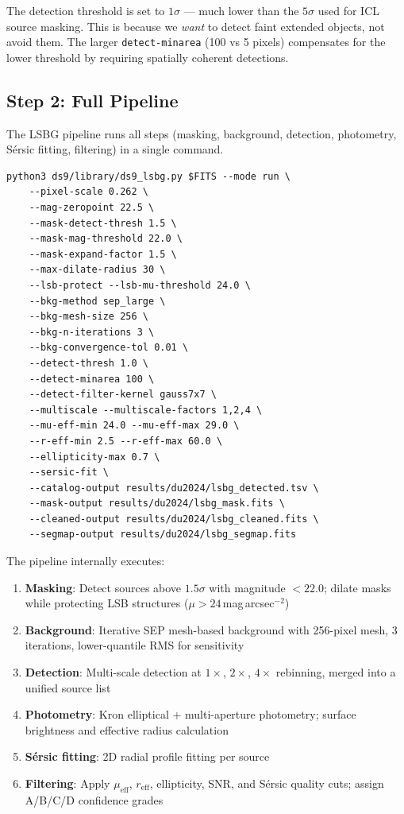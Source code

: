 \documentclass[11pt,fleqn]{book}
\begin{document}
\begin{remark}
The detection threshold is set to $1\sigma$ --- much lower than the
$5\sigma$ used for ICL source masking. This is because we \emph{want}
to detect faint extended objects, not avoid them.
The larger \texttt{detect-minarea} (100 vs 5 pixels) compensates for the
lower threshold by requiring spatially coherent detections.
\end{remark}

\subsection{Step 2: Full Pipeline}

The LSBG pipeline runs all steps (masking, background, detection,
photometry, S\'ersic fitting, filtering) in a single command.

\begin{codebox}
\begin{lstlisting}[style=bash,numbers=none]
python3 ds9/library/ds9_lsbg.py $FITS --mode run \
    --pixel-scale 0.262 \
    --mag-zeropoint 22.5 \
    --mask-detect-thresh 1.5 \
    --mask-mag-threshold 22.0 \
    --mask-expand-factor 1.5 \
    --max-dilate-radius 30 \
    --lsb-protect --lsb-mu-threshold 24.0 \
    --bkg-method sep_large \
    --bkg-mesh-size 256 \
    --bkg-n-iterations 3 \
    --bkg-convergence-tol 0.01 \
    --detect-thresh 1.0 \
    --detect-minarea 100 \
    --detect-filter-kernel gauss7x7 \
    --multiscale --multiscale-factors 1,2,4 \
    --mu-eff-min 24.0 --mu-eff-max 29.0 \
    --r-eff-min 2.5 --r-eff-max 60.0 \
    --ellipticity-max 0.7 \
    --sersic-fit \
    --catalog-output results/du2024/lsbg_detected.tsv \
    --mask-output results/du2024/lsbg_mask.fits \
    --cleaned-output results/du2024/lsbg_cleaned.fits \
    --segmap-output results/du2024/lsbg_segmap.fits
\end{lstlisting}
\end{codebox}

\noindent
The pipeline internally executes:
\begin{enumerate}
  \item \textbf{Masking}: Detect sources above $1.5\sigma$ with magnitude
        $< 22.0$; dilate masks while protecting LSB structures
        ($\mu > 24$\,mag\,arcsec$^{-2}$)
  \item \textbf{Background}: Iterative SEP mesh-based background with
        256-pixel mesh, 3 iterations, lower-quantile RMS for sensitivity
  \item \textbf{Detection}: Multi-scale detection at $1\times$, $2\times$,
        $4\times$ rebinning, merged into a unified source list
  \item \textbf{Photometry}: Kron elliptical + multi-aperture photometry;
        surface brightness and effective radius calculation
  \item \textbf{S\'ersic fitting}: 2D radial profile fitting per source
  \item \textbf{Filtering}: Apply $\mu_\mathrm{eff}$, $r_\mathrm{eff}$,
        ellipticity, SNR, and S\'ersic quality cuts;
        assign A/B/C/D confidence grades
\end{enumerate}
\end{document}
